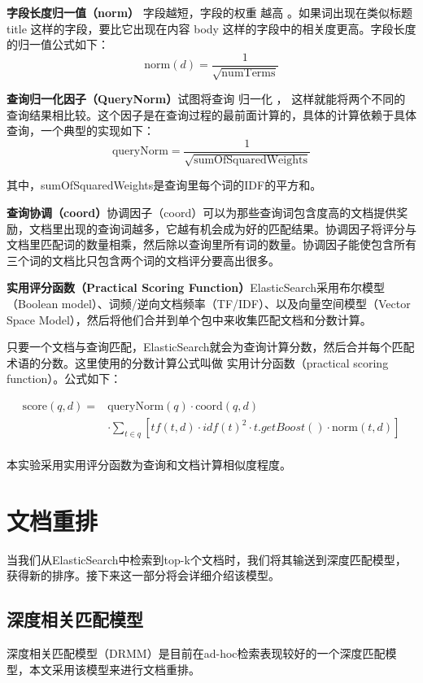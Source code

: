 \documentclass[a4paper]{article}
\begin{document}
\textbf{字段长度归一值（norm）} 字段越短，字段的权重 越高 。如果词出现在类似标题 title 这样的字段，要比它出现在内容 body 这样的字段中的相关度更高。字段长度的归一值公式如下：
\begin{equation}
    \text{norm}(d)=\frac{1}{\sqrt{\text{numTerms}}}
\end{equation}

\textbf{查询归一化因子（QueryNorm）}试图将查询 归一化 ， 这样就能将两个不同的查询结果相比较。这个因子是在查询过程的最前面计算的，具体的计算依赖于具体查询，一个典型的实现如下：
\begin{equation}
    \text{queryNorm} = \frac{1}{\sqrt{\text{sumOfSquaredWeights}}}
\end{equation}

其中，sumOfSquaredWeights是查询里每个词的IDF的平方和。

\textbf{查询协调（coord）}协调因子（coord）可以为那些查询词包含度高的文档提供奖励，文档里出现的查询词越多，它越有机会成为好的匹配结果。协调因子将评分与文档里匹配词的数量相乘，然后除以查询里所有词的数量。协调因子能使包含所有三个词的文档比只包含两个词的文档评分要高出很多。

\textbf{实用评分函数（Practical Scoring Function）}ElasticSearch采用布尔模型（Boolean model）、词频/逆向文档频率（TF/IDF）、以及向量空间模型（Vector Space Model），然后将他们合并到单个包中来收集匹配文档和分数计算。

只要一个文档与查询匹配，ElasticSearch就会为查询计算分数，然后合并每个匹配术语的分数。这里使用的分数计算公式叫做 实用计分函数（practical scoring function）。公式如下：

\begin{equation}
    \begin{aligned}
        \text{score}(q, d)= &\text{queryNorm}(q)\cdot\text{coord}(q,d)\\
        &\cdot\sum_{t\in q}{[tf(t, d)\cdot idf(t)^2\cdot t.getBoost()\cdot\text{norm}(t,d)]}\\
    \end{aligned}
\end{equation}

本实验采用实用评分函数为查询和文档计算相似度程度。

\pagebreak
\section{文档重排}
当我们从ElasticSearch中检索到top-k个文档时，我们将其输送到深度匹配模型，获得新的排序。接下来这一部分将会详细介绍该模型。
\subsection{深度相关匹配模型}
深度相关匹配模型（DRMM）\cite{guo2016deep}是目前在ad-hoc检索表现较好的一个深度匹配模型，本文采用该模型来进行文档重排。
\end{document}
